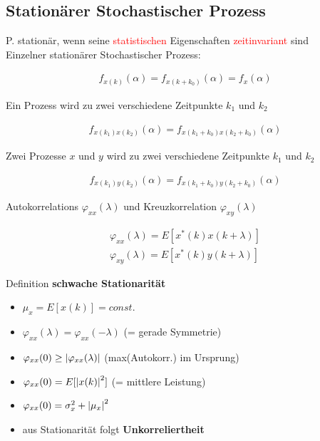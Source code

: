 \documentclass[10pt,a4paper]{article}
\begin{document}
\subsection{Stationärer Stochastischer Prozess}
P. stationär, wenn seine \textcolor{red}{statistischen} Eigenschaften \textcolor{red}{zeitinvariant} sind \\
Einzelner stationärer Stochastischer Prozess:
  \begin{mdframed}[style=exercise]
    \begin{align}
        f_{x(k)}(\alpha) = f_{x(k+k_0)}(\alpha) = f_x(\alpha)
    \end{align}
  \end{mdframed}
Ein Prozess wird zu zwei verschiedene Zeitpunkte $k_1$ und $k_2$
  \begin{mdframed}[style=exercise]
    \begin{align}
        f_{x(k_1)x(k_2)}(\alpha) = f_{x(k_1+k_0)x(k_2+k_0)}(\alpha)
    \end{align}
  \end{mdframed}
Zwei Prozesse $x$ und $y$ wird zu zwei verschiedene Zeitpunkte $k_1$ und $k_2$
\begin{mdframed}[style=exercise]
    \begin{align}
        f_{x(k_1)y(k_2)}(\alpha) = f_{x(k_1+k_0)y(k_2+k_0)}(\alpha)
    \end{align}
  \end{mdframed}
Autokorrelations $\varphi_{xx}(\lambda)$ und Kreuzkorrelation $\varphi_{xy}(\lambda)$
\begin{mdframed}[style=exercise]
    \begin{align}
        \varphi_{xx}(\lambda) = E[x^*(k)x(k+\lambda)] \\
        \varphi_{xy}(\lambda) =E[x^*(k)y(k+\lambda)]
    \end{align}
  \end{mdframed}
Definition \textbf{schwache Stationarität}
\begin{itemize}
    \item $\mu_x = E[x(k)] = const.$
    \item $\varphi_{xx}(\lambda) = \varphi_{xx}(-\lambda)$ (= gerade Symmetrie)
    \item $\varphi_{xx}(0) \geq \abs{\varphi_{xx}(\lambda)}$ (max(Autokorr.) im Ursprung)
    \item $\varphi_{xx}(0) =E[\abs{x(k)}^2]$ (= mittlere Leistung)
    \item $\varphi_{xx}(0) = \sigma_x^2 + \abs{\mu_x}^2$
    \item aus Stationarität folgt \textbf{Unkorreliertheit}
\end{itemize}
\end{document}
